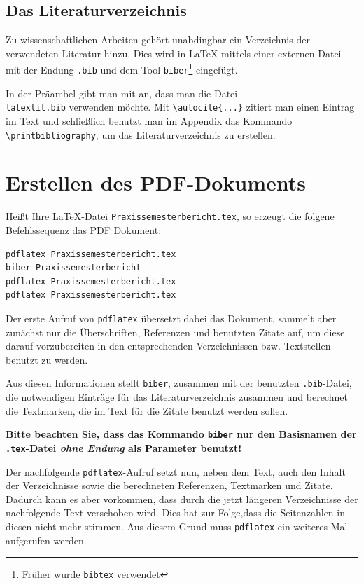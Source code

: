 \documentclass[pdftex,a4paper]{scrartcl}
\begin{document}


\subsection{Das Literaturverzeichnis}

Zu wissenschaftlichen Arbeiten gehört unabdingbar ein Verzeichnis der verwendeten Literatur hinzu. Dies wird in \LaTeX{} mittels einer externen Datei mit der Endung \verb+.bib+ und dem Tool \verb+biber+\footnote{Früher wurde \texttt{bibtex} verwendet} eingefügt.


In der Präambel gibt man mit \verb++ an, dass man die Datei \\\verb+latexlit.bib+ verwenden möchte. Mit  \verb+\autocite{...}+ zitiert man einen Eintrag im Text und schließlich benutzt man im Appendix das Kommando \verb+\printbibliography+, um das Literaturverzeichnis zu erstellen.

\section{Erstellen des PDF-Dokuments}

Heißt Ihre \LaTeX{}-Datei \verb+Praxissemesterbericht.tex+, so erzeugt die folgene Befehlssequenz das PDF Dokument:

\begin{verbatim}
pdflatex Praxissemesterbericht.tex
biber Praxissemesterbericht
pdflatex Praxissemesterbericht.tex
pdflatex Praxissemesterbericht.tex
\end{verbatim}

Der erste Aufruf von \texttt{pdflatex} übersetzt dabei das Dokument, sammelt aber zunächst nur die Überschriften, Referenzen und benutzten Zitate auf, um diese darauf vorzubereiten in den entsprechenden Verzeichnissen bzw. Textstellen benutzt zu werden.

Aus diesen Informationen stellt \texttt{biber}, zusammen mit der benutzten \texttt{.bib}-Datei, die notwendigen Einträge für das Literaturverzeichnis zusammen und berechnet die Textmarken, die im Text für die Zitate benutzt werden sollen.

\textbf{Bitte beachten Sie, dass das Kommando \texttt{biber} nur den Basisnamen der \texttt{.tex}-Datei \textit{ohne Endung} als Parameter benutzt!}

Der nachfolgende \texttt{pdflatex}-Aufruf setzt nun, neben dem Text, auch den Inhalt der Verzeichnisse sowie die berechneten Referenzen, Textmarken und Zitate. Dadurch kann es aber vorkommen, dass durch die jetzt längeren Verzeichnisse der nachfolgende Text verschoben wird. Dies hat zur Folge,dass die Seitenzahlen in diesen nicht mehr stimmen. Aus diesem Grund muss \texttt{pdflatex} ein weiteres Mal aufgerufen werden.

\appendix
\printbibliography[heading=bibintoc]
\end{document}
